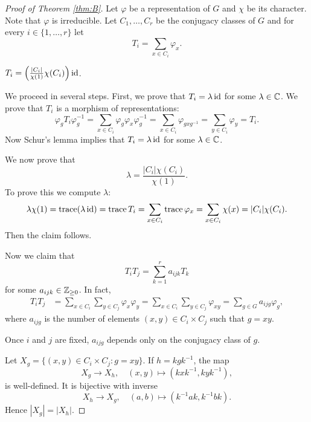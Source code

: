 \begin{proof}[Proof of Theorem \ref{thm:B}]
    Let $\varphi$ be a representation of $G$ and 
    $\chi$ be its character. Note that $\varphi$ is irreducible. 
    Let $C_1,\dots,C_r$ be the conjugacy classes of $G$ 
    and for every $i\in\{1,\dots,r\}$ let 
    \[
    T_i=\sum_{x\in C_i}\varphi_x. 
    \]
    
    \begin{claim}
        $T_i=\left(\frac{|C_i|}{\chi(1)}\chi(C_i)\right)\operatorname{id}$. 
    \end{claim}
    
    We proceed in several steps. First, we prove that 
    $T_i=\lambda\operatorname{id}$ for some $\lambda\in\mathbb{C}$. 
    We prove that $T_i$ is a morphism of representations:
    \[
    \varphi_gT_i\varphi_g^{-1}=\sum_{x\in C_i}\varphi_g\varphi_x\varphi_g^{-1}
    =\sum_{x\in C_i}\varphi_{gxg^{-1}}=\sum_{y\in C_i}\varphi_y=T_i.
    \]
    Now Schur's lemma implies that $T_i=\lambda\operatorname{id}$ for some
    $\lambda\in\mathbb{C}$. 
    
    We now prove that 
    \[
    \lambda=\frac{|C_i|\chi(C_i)}{\chi(1)}.
    \]
    To prove
    this we compute $\lambda$:
    \[
    \lambda\chi(1)=\operatorname{trace}(\lambda\operatorname{id})
    =\operatorname{trace} T_i
    =\sum_{x\in C_i}\operatorname{trace}\varphi_x
    =\sum_{x\in C_i}\chi(x)
    =|C_i|\chi(C_i).
    \]
    Then the claim follows. 
    
    Now we claim that 
    \[
    T_iT_j=\sum_{k=1}^r a_{ijk}T_k
    \]
    for some $a_{ijk}\in\mathbb{Z}_{\geq0}$. In fact, 
    \begin{align*}
        T_iT_j &= \sum_{x\in C_i}\sum_{y\in C_j}\varphi_x\varphi_y
        =\sum_{x\in C_i}\sum_{y\in C_j}\varphi_{xy}
        =\sum_{g\in G}a_{ijg}\varphi_g,
    \end{align*}
    where $a_{ijg}$ is the number of elements $(x,y)\in C_i\times C_j$ 
    such that $g=xy$. 
    
    \begin{claim}
        Once $i$ and $j$ are fixed, $a_{ijg}$ depends only on the conjugacy class of $g$. 
    \end{claim}
    
    Let $X_g=\{(x,y)\in C_i\times C_j:g=xy\}$. If $h=kgk^{-1}$, the map
    \[
    X_g\to X_h,\quad (x,y)\mapsto (kxk^{-1},kyk^{-1}),
    \]
    is well-defined. It is bijective with inverse
    \[
    X_h\to X_g,\quad
    (a,b)\mapsto (k^{-1}ak,k^{-1}bk).
    \]
    Hence $|X_g|=|X_h|$. 


\end{proof}
